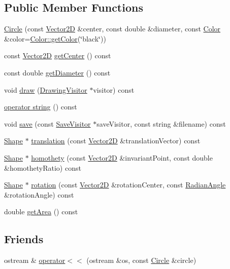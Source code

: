 \subsection*{Public Member Functions}
\begin{DoxyCompactItemize}
\item 
\hyperlink{class_circle_a68b0710e21ca715da8bb16c269f8e0ba}{Circle} (const \hyperlink{class_vector2_d}{Vector2D} \&center, const double \&diameter, const \hyperlink{class_color}{Color} \&color=\hyperlink{class_color_a94697e8c9eb81124c5a7c1439e1e7348}{Color\+::get\+Color}(\char`\"{}black\char`\"{}))
\item 
const \hyperlink{class_vector2_d}{Vector2D} \hyperlink{class_circle_a4ed140857e0622e97377f60993c4ec44}{get\+Center} () const
\item 
const double \hyperlink{class_circle_af54e2c9adcf8e6f53ec51560fff849d7}{get\+Diameter} () const
\item 
void \hyperlink{class_circle_a4c2dc8107eab8b562328743cafdddd79}{draw} (\hyperlink{class_drawing_visitor}{Drawing\+Visitor} $\ast$visitor) const
\item 
\hyperlink{class_circle_a4533a225b6d02699cea4045f47d3c7ff}{operator string} () const
\item 
void \hyperlink{class_circle_a91f2af619cc0465ae297ea88ce3b6c23}{save} (const \hyperlink{class_save_visitor}{Save\+Visitor} $\ast$save\+Visitor, const string \&filename) const
\item 
\hyperlink{class_shape}{Shape} $\ast$ \hyperlink{class_circle_ad3b54b369f44baa1947aa3991f55e068}{translation} (const \hyperlink{class_vector2_d}{Vector2D} \&translation\+Vector) const
\item 
\hyperlink{class_shape}{Shape} $\ast$ \hyperlink{class_circle_a031f188681977c2cf6ba2e80e30fb5ce}{homothety} (const \hyperlink{class_vector2_d}{Vector2D} \&invariant\+Point, const double \&homothety\+Ratio) const
\item 
\hyperlink{class_shape}{Shape} $\ast$ \hyperlink{class_circle_ac676105f9868877ffcecc9c236de10bb}{rotation} (const \hyperlink{class_vector2_d}{Vector2D} \&rotation\+Center, const \hyperlink{class_radian_angle}{Radian\+Angle} \&rotation\+Angle) const
\item 
double \hyperlink{class_circle_a7bfb5ab5c8d4f11890407a2483ad61ee}{get\+Area} () const
\end{DoxyCompactItemize}
\subsection*{Friends}
\begin{DoxyCompactItemize}
\item 
ostream \& \hyperlink{class_circle_aff122891f2c5c68c5016c71add530da2}{operator$<$$<$} (ostream \&os, const \hyperlink{class_circle}{Circle} \&circle)
\end{DoxyCompactItemize}
